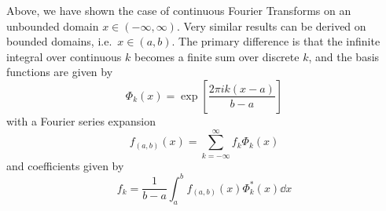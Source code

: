 Above, we have shown the case of continuous Fourier Transforms on an
unbounded domain $x \in (-\infty, \infty)$.  Very similar results can
be derived on bounded domains, i.e.~$x \in (a, b)$.  The primary difference
is that the infinite integral over continuous $k$ becomes a finite sum
over discrete $k$, and the basis functions are given by
\begin{equation}
  \Phi_k(x) = \exp\left[\frac{2\pi i k (x - a)}{b - a}\right]
\end{equation}
with a Fourier series expansion
\begin{equation}
  \label{eq:FS_1D}
  f_{(a, b)}(x) = \sum_{k=-\infty}^\infty f_k \Phi_k(x)
\end{equation}
and coefficients given by
\begin{equation}
  \label{eq:IFS_1D}
  f_k = \frac{1}{b - a}\int_a^b f_{(a, b)}(x) \Phi^\ast_k(x) \dd x
\end{equation}
